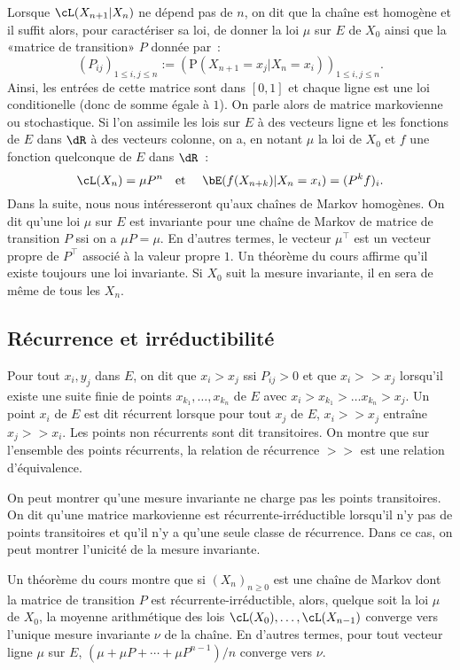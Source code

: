 {{Lorsque $\cL(X_{n+1} \vert X_n)$ ne dépend pas de $n$, on dit que la
chaîne est homogène et il suffit alors, pour caractériser sa loi, de donner la
loi $\mu$ sur $E$ de $X_0$ ainsi que la «matrice de transition» $P$ donnée
par~:
$$
(P_{ij})_{1\leq i,j\leq n} 
:=\left(\mathrm{P}(X_{n+1}=x_j\vert X_n=x_i)\right)_{1\leq i,j\leq n}.
$$
Ainsi, les entrées de cette matrice sont dans $[0,1]$ et chaque ligne est
une loi conditionelle (donc de somme égale à $1$). On parle alors de matrice
markovienne ou stochastique. Si l'on assimile les lois sur $E$ à des vecteurs
ligne et les fonctions de $E$ dans $\dR$ à des vecteurs colonne, on a, en
notant $\mu$ la loi de $X_0$ et $f$ une fonction quelconque de $E$ dans
$\dR$~:
$$
\cL(X_n) = \mu P^n \text{\quad et \quad}
\bE(f(X_{n+k})\vert X_n=x_i)=(P^k f)_i.
$$
Dans la suite, nous nous intéresseront qu'aux chaînes de Markov homogènes.
On dit qu'une loi $\mu$ sur $E$ est invariante pour une chaîne de Markov de
matrice de transition $P$ ssi on a $\mu P = \mu$. En d'autres termes, le
vecteur $\mu^\top$ est un vecteur propre de $P^\top$ associé à la valeur
propre $1$. Un théorème du cours affirme qu'il existe toujours une loi
invariante. Si $X_0$ suit la mesure invariante, il en sera de même de tous les
$X_n$. 

%
\subsection{Récurrence et irréductibilité}
%

Pour tout $x_i,y_j$ dans $E$, on dit que $x_i > x_j$ ssi $P_{ij}>0$ et que
$x_i >> x_j$ lorsqu'il existe une suite finie de points
$x_{k_1},\ldots,x_{k_n}$ de $E$ avec $x_i > x_{k_1} > \ldots x_{k_n} > x_j$.
Un point $x_i$ de $E$ est dit récurrent lorsque pour tout $x_j$ de $E$, $x_i
>> x_j$ entraîne $x_j >> x_i$. Les points non récurrents sont dit
transitoires. On montre que sur l'ensemble des points récurrents, la relation
de récurrence $>>$ est une relation d'équivalence. 

On peut montrer qu'une mesure invariante ne charge pas les points transitoires.
On dit qu'une matrice markovienne est récurrente-irréductible lorsqu'il n'y
pas de points transitoires et qu'il n'y a qu'une seule classe de récurrence.
Dans ce cas, on peut montrer l'unicité de la mesure invariante.

Un théorème du cours montre que si $(X_n)_{n\geq 0}$ est une chaîne de Markov
dont la matrice de transition $P$ est récurrente-irréductible, alors, quelque
soit la loi $\mu$ de $X_0$, la moyenne arithmétique des lois
$\cL(X_0),\ldots,\cL(X_{n-1})$ converge vers l'unique mesure
invariante $\nu$ de la chaîne. En d'autres termes, pour tout vecteur ligne
$\mu$ sur $E$, $(\mu+\mu P + \cdots + \mu P^{n-1})/n$ converge vers $\nu$.

}}
